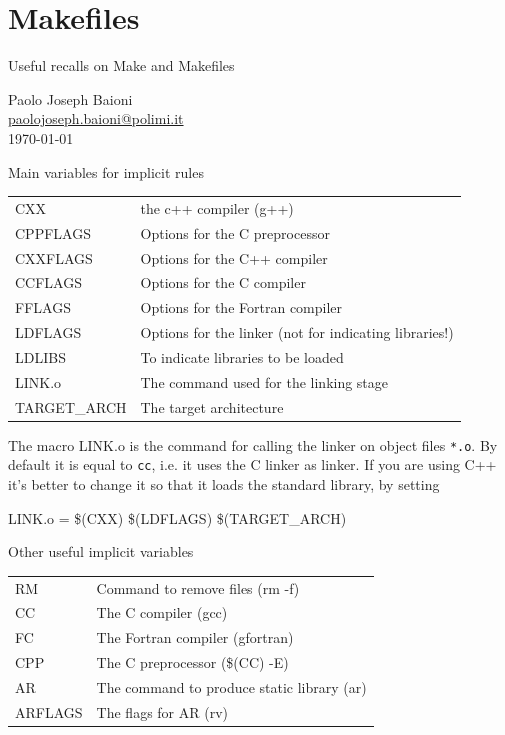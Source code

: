 \documentclass[10pt,aspectratio=169]{beamer}
\newcommand{\blue}{\color{blue}}
\begin{document}
\section{Makefiles}
\begin{frame}
\centering
{ \huge Useful recalls on Make and Makefiles}\\

\vspace{1cm}

\large Paolo Joseph Baioni \\ \href{mailto:paolojoseph.baioni@polimi.it}{\normalsize\color{blue}paolojoseph.baioni@polimi.it}\\

\vfill\today
\end{frame}

\begin{frame}{Main variables for implicit rules}
\begin{tabular}{>{\ttfamily}l|l} CXX & the c++ compiler (g++)\\
  CPPFLAGS & Options for the C preprocessor\\
  CXXFLAGS & Options for the
             C++ compiler\\
  CCFLAGS & Options for the C compiler\\
  FFLAGS & Options for the Fortran compiler\\
  LDFLAGS & Options for the linker \alert{(not for indicating libraries!)}\\   LDLIBS & To indicate libraries to be loaded\\
  LINK.o & The command used for the linking stage\\
  TARGET\_ARCH & The target architecture\\
\end{tabular}
\medskip

The macro \alert{LINK.o} is the command for calling the {\blue linker}
on object files \texttt{*.o}. By default it is equal to \texttt{cc}, i.e. it uses the C linker as linker. If you are using C++ it's better to change it so that it loads the standard library, by setting
\begin{semiverbatim}
    LINK.o = \$(CXX) \$(LDFLAGS) \$(TARGET\_ARCH)
\end{semiverbatim}

\smallskip
\end{frame}

\begin{frame}{Other useful implicit variables}

  \begin{tabular}{>{\ttfamily}l|l}
RM & Command to remove files (rm -f)\\
CC & The C compiler (gcc)\\
    FC & The Fortran compiler (gfortran)\\
    CPP & The C preprocessor (\$(CC) -E)\\
    AR  & The command to produce static library (ar)\\
    ARFLAGS & The flags for AR (rv)
\end{tabular}
\end{frame}
\end{document}
